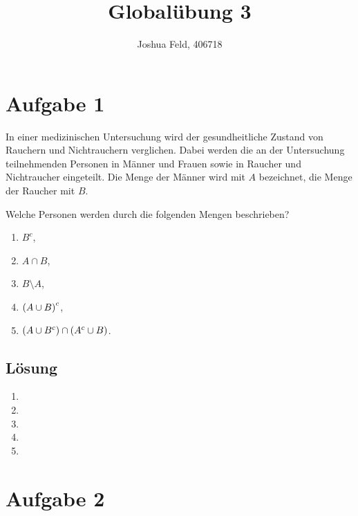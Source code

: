 \documentclass{exercise}
\institute{Institut für Statistik und Wirtschaftsmathematik}
\title{Globalübung 3}
\author{Joshua Feld, 406718}
\begin{document}
    \maketitle


    \section*{Aufgabe 1}

    \begin{problem}
        In einer medizinischen Untersuchung wird der gesundheitliche Zustand von Rauchern und Nichtrauchern verglichen.
        Dabei werden die an der Untersuchung teilnehmenden Personen in Männer und Frauen sowie in Raucher und Nichtraucher eingeteilt.
        Die Menge der Männer wird mit \(A\) bezeichnet, die Menge der Raucher mit \(B\).
        
        Welche Personen werden durch die folgenden Mengen beschrieben?
        \begin{enumerate}
            \item \(B^c\),
            \item \(A \cap B\),
            \item \(B \setminus A\),
            \item \(\parentheses*{A \cup B}^c\),
            \item \(\parentheses*{A \cup B^c} \cap \parentheses*{A^c \cup B}\).
        \end{enumerate}
    \end{problem}

    \subsection*{Lösung}
    \begin{enumerate}
        \item
        \item
        \item
        \item
        \item
    \end{enumerate}


    \section*{Aufgabe 2}
\end{document}
